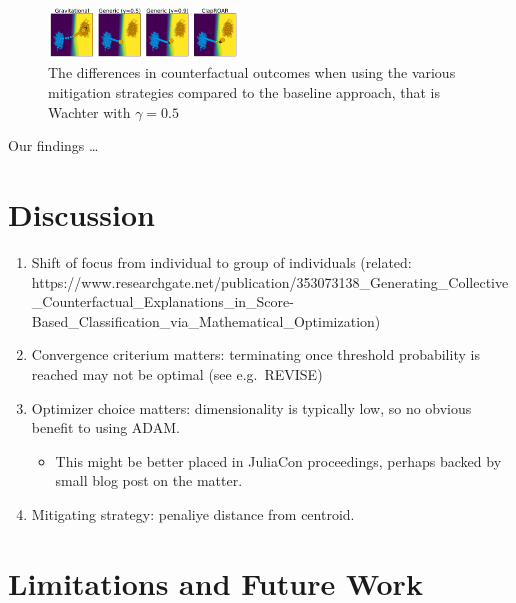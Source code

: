 \documentclass[
  conference]{IEEEtran}
\providecommand{\tightlist}{%
  \setlength{\itemsep}{0pt}\setlength{\parskip}{0pt}}\usepackage{longtable,booktabs,array}
\begin{document}
\begin{figure}

{\centering \includegraphics[width=0.45\textwidth,height=\textheight]{www/mitigation.png}

}

\caption{\label{fig-mitigation}The differences in counterfactual
outcomes when using the various mitigation strategies compared to the
baseline approach, that is Wachter with \(\gamma=0.5\)}

\end{figure}

Our findings \ldots{}

\hypertarget{sec-discussion}{%
\section{Discussion}\label{sec-discussion}}

\begin{enumerate}
\def\labelenumi{\arabic{enumi}.}
\tightlist
\item
  Shift of focus from individual to group of individuals (related:
  https://www.researchgate.net/publication/353073138\_Generating\_Collective\_Counterfactual\_Explanations\_in\_Score-Based\_Classification\_via\_Mathematical\_Optimization)
\item
  Convergence criterium matters: terminating once threshold probability
  is reached may not be optimal (see e.g.~REVISE)
\item
  Optimizer choice matters: dimensionality is typically low, so no
  obvious benefit to using ADAM.

  \begin{itemize}
  \tightlist
  \item
    This might be better placed in JuliaCon proceedings, perhaps backed
    by small blog post on the matter.
  \end{itemize}
\item
  Mitigating strategy: penaliye distance from centroid.
\end{enumerate}

\hypertarget{sec-limit}{%
\section{Limitations and Future Work}\label{sec-limit}}
\end{document}
